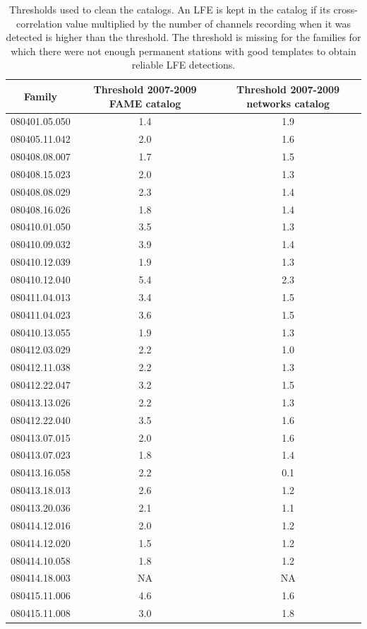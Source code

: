 \documentclass[draft]{agujournal2019}
\begin{document}
\begin{table}[hbt!]
\caption{Thresholds used to clean the catalogs. An LFE is kept in the catalog if its cross-correlation value multiplied by the number of channels recording when it was detected is higher than the threshold. The threshold is missing for the families for which there were not enough permanent stations with good templates to obtain reliable LFE detections.}
\centering
\scriptsize
\begin{tabular}{c c c}
\hline
Family & Threshold 2007-2009 FAME catalog & Threshold 2007-2009 networks catalog\\
\hline
080401.05.050 & 1.4 & 1.9 \\
080405.11.042 & 2.0 & 1.6 \\
080408.08.007 & 1.7 & 1.5 \\
080408.15.023 & 2.0 & 1.3 \\
080408.08.029 & 2.3 & 1.4 \\
080408.16.026 & 1.8 & 1.4 \\
080410.01.050 & 3.5 & 1.3 \\
080410.09.032 & 3.9 & 1.4 \\
080410.12.039 & 1.9 & 1.3 \\
080410.12.040 & 5.4 & 2.3 \\
080411.04.013 & 3.4 & 1.5 \\
080411.04.023 & 3.6 & 1.5 \\
080410.13.055 & 1.9 & 1.3 \\
080412.03.029 & 2.2 & 1.0 \\
080412.11.038 & 2.2 & 1.3 \\
080412.22.047 & 3.2 & 1.5 \\
080413.13.026 & 2.2 & 1.3 \\
080412.22.040 & 3.5 & 1.6 \\
080413.07.015 & 2.0 & 1.6 \\
080413.07.023 & 1.8 & 1.4 \\
080413.16.058 & 2.2 & 0.1 \\
080413.18.013 & 2.6 & 1.2 \\
080413.20.036 & 2.1 & 1.1 \\
080414.12.016 & 2.0 & 1.2 \\
080414.12.020 & 1.5 & 1.2 \\
080414.10.058 & 1.8 & 1.2 \\
080414.18.003 & NA & NA \\
080415.11.006 & 4.6 & 1.6 \\
080415.11.008 & 3.0 & 1.8 \\

\end{tabular}
\end{table}
\end{document}
